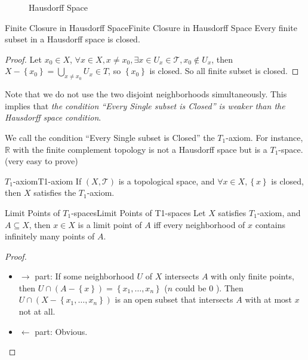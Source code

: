 \documentclass[../main.tex]{subfiles}
\begin{document}
\begin{figure}[ht]
    \centering
    \caption{Hausdorff Space}
    \label{fig:hausdorff-space}
\end{figure}

\begin{theorem}{Finite Closure in Hausdorff Space}{Finite Closure in Hausdorff Space}
Every finite subset in a Hausdorff space is closed.
\end{theorem}
\begin{proof}
Let $x_0\in X$, $\forall x\in X, x\neq x_0, \exists x\in U_x\in \mathcal{T},x_0\notin U_x$, then $X-\left\{ x_0 \right\} = \bigcup_{x\neq x_0} U_x\in T$, so $\left\{ x_0 \right\}$ is closed. So all finite subset is closed.
\end{proof}

\begin{remark}
Note that we do not use the two disjoint neighborhoods simultaneously. This implies that \emph{the condition ``Every Single subset is Closed'' is weaker than the Hausdorff space condition}.

\vspace{3pt}
We call the condition ``Every Single subset is Closed'' the $T_1$-axiom. For instance, $\mathbb{R}$ with the finite complement topology is not a Hausdorff space but is a $T_1$-space. (very easy to prove)
\end{remark}

\begin{definition}{$T_1$-axiom}{T1-axiom}
If $(X,\mathcal{T})$ is a topological space, and $\forall x\in X, \left\{ x \right\}$ is closed, then $X$ satisfies the $T_1$-axiom.
\end{definition}

\begin{theorem}{Limit Points of $T_1$-spaces}{Limit Points of T1-spaces}
Let $X$ satisfies $T_1$-axiom, and $A \subseteq X$, then $x\in X$ is a limit point of $A$ iff every neighborhood of $x$ contains infinitely many points of $A$.
\end{theorem}
\begin{proof}
\begin{itemize}
\item $\rightarrow $ part: If some neighborhood $U$ of $X$ intersects $A$ with only finite points, then $U\cap (A-\left\{ x \right\}) = \left\{ x_1, \ldots ,x_n \right\}$ ($n$ could be $0$ ). Then $U\cap (X-\left\{ x_1, \ldots ,x_n \right\})$ is an open subset that intersects $A$ with at most $x$ not at all.

\item  $\leftarrow$ part: Obvious.
\end{itemize}
\end{proof}
\end{document}
